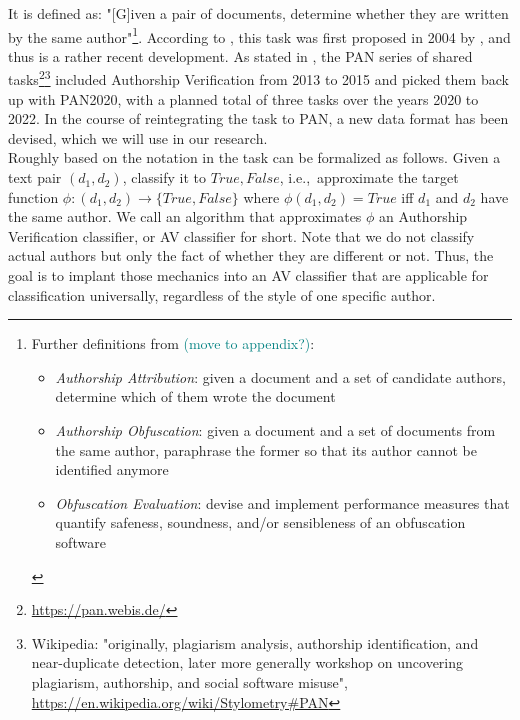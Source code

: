 It is defined as: "[G]iven a pair of documents, determine whether they are written by the same author"\footnote{
Further definitions from \cite{bevendorff2020shared} \textcolor{teal}{(move to appendix?)}:
\begin{itemize}
  \item \textit{Authorship Attribution}: given a document and a set of candidate authors, determine which of them wrote the document
  \item \textit{Authorship Obfuscation}: given a document and a set of documents from the same author, paraphrase the former so that its author cannot be identified anymore
  \item \textit{Obfuscation Evaluation}: devise and implement performance measures that quantify safeness, soundness, and/or sensibleness of an obfuscation software
\end{itemize}
}.
According to \cite{stein2019unbiasedGutenbergCorpus}, this task was first proposed in 2004 by \cite{koppel2004unmasking}, and thus is a rather recent development.
As stated in \cite{bevendorff2020shared}, the PAN series of shared tasks\footnote{\url{https://pan.webis.de/}}\footnote{Wikipedia: "originally, plagiarism analysis, authorship identification, and near-duplicate detection, later more generally workshop on uncovering plagiarism, authorship, and social software misuse", \url{https://en.wikipedia.org/wiki/Stylometry\#PAN}} included Authorship Verification from 2013 to 2015 and picked them back up with PAN2020, with a planned total of three tasks over the years 2020 to 2022.
In the course of reintegrating the task to PAN, a new data format has been devised, which we will use in our research.\\
Roughly based on the notation in \cite{bevendorff2020shared} the task can be formalized as follows.
Given a text pair $(d_1, d_2)$, classify it to ${True, False}$, i.e.,\ approximate the target function $\phi{}:(d_1, d_2)\to\{True, False\}$ where $\phi(d_1, d_2)=True$ iff $d_1$ and $d_2$ have the same author.
We call an algorithm that approximates $\phi$ an Authorship Verification classifier, or AV classifier for short.
Note that we do not classify actual authors but only the fact of whether they are different or not.
Thus, the goal is to implant those mechanics into an AV classifier that are applicable for classification universally, regardless of the style of one specific author.

